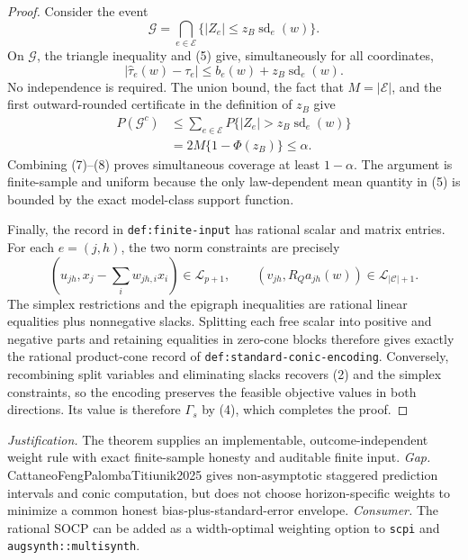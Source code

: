 \documentclass{article}
\begin{document}
\begin{proof}
Consider the event
\[
 \mathcal G=
 \bigcap_{e\in\mathcal E}
 \{|Z_e|\leq z_B\operatorname{sd}_e(w)\}.
 \tag{6}
\]
On \(\mathcal G\), the triangle inequality and (5) give, simultaneously for
all coordinates,
\[
 |\widehat\tau_e(w)-\tau_e|
 \leq b_e(w)+z_B\operatorname{sd}_e(w).
 \tag{7}
\]
No independence is required.  The union bound, the fact that
\(M=|\mathcal E|\), and the first outward-rounded certificate in the
definition of \(z_B\) give
\[
\begin{aligned}
 P(\mathcal G^c)
 &\leq\sum_{e\in\mathcal E}
       P\{|Z_e|>z_B\operatorname{sd}_e(w)\}\\
 &=2M\{1-\Phi(z_B)\}
 \leq\alpha.
\end{aligned}
\tag{8}
\]
Combining (7)--(8) proves simultaneous coverage at least \(1-\alpha\).
The argument is finite-sample and uniform because the only law-dependent
mean quantity in (5) is bounded by the exact model-class support function.

Finally, the record in \texttt{def:finite-input} has rational scalar and
matrix entries.  For each \(e=(j,h)\), the two norm constraints are precisely
\[
 \left(u_{jh},x_j-\sum_iw_{jh,i}x_i\right)\in\mathcal L_{p+1},
 \qquad
 (v_{jh},R_Qa_{jh}(w))\in\mathcal L_{|\mathcal C|+1}.
 \tag{9}
\]
The simplex restrictions and the epigraph inequalities are rational linear
equalities plus nonnegative slacks.  Splitting each free scalar into positive
and negative parts and retaining equalities in zero-cone blocks therefore
gives exactly the rational product-cone record of
\texttt{def:standard-conic-encoding}.  Conversely, recombining split
variables and eliminating slacks recovers (2) and the simplex constraints,
so the encoding preserves the feasible objective values in both directions.
Its value is therefore \(\Gamma_s\) by (4), which completes the proof.
\end{proof}
\par\smallskip\noindent \textit{Justification.} The theorem supplies an implementable, outcome-independent weight rule with exact finite-sample honesty and auditable finite input. \textit{Gap.} CattaneoFengPalombaTitiunik2025 gives non-asymptotic staggered prediction intervals and conic computation, but does not choose horizon-specific weights to minimize a common honest bias-plus-standard-error envelope. \textit{Consumer.} The rational SOCP can be added as a width-optimal weighting option to \texttt{scpi} and \texttt{augsynth::multisynth}.
\end{document}
